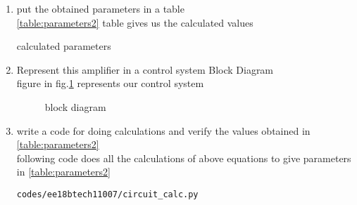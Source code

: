 \begin{enumerate}[label=\thesection.\arabic*.,ref=\thesection.\theenumi]
thus $R_{out}$ is increased (from $r_{o3}$) but not by (1+GH)
\item put the obtained parameters in a table
\\
\solution \ref{table:parameters2} table gives us the calculated values
\begin{table}[!ht]
\centering

\caption{calculated parameters}
\label{table:parameters2}
\end{table}
\item Represent this amplifier in  a control system Block Diagram
\\
\solution figure in  fig.\ref{fig:ee18btech11007_block_diagram} represents our control system
\begin{figure}[!ht]
	\begin{center}
		
		\resizebox{\columnwidth}{!}{}
	\end{center}
\caption{block diagram}
\label{fig:ee18btech11007_block_diagram}
\end{figure}
\item write a code for doing calculations and verify the values obtained in \ref{table:parameters2} 
\\
\solution 
following code does all the calculations of above equations to give parameters in
\ref{table:parameters2} 
\begin{lstlisting}
codes/ee18btech11007/circuit_calc.py
\end{lstlisting}



\end{enumerate}
